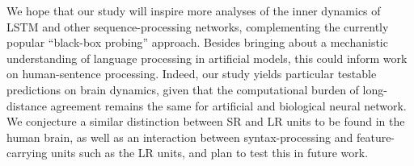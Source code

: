 
We hope that our study will inspire more analyses of the inner dynamics of LSTM and other sequence-processing networks, complementing the currently popular ``black-box probing'' approach. Besides bringing about a mechanistic understanding of language processing in artificial models, this could inform work on human-sentence processing. Indeed, our study yields particular testable predictions on brain dynamics, given that the computational burden of long-distance agreement remains the same for artificial and biological neural network. We conjecture a similar distinction between SR and LR units to be found in the human brain, as well as an interaction between syntax-processing and feature-carrying units such as the LR units, and plan to test this in future work.





